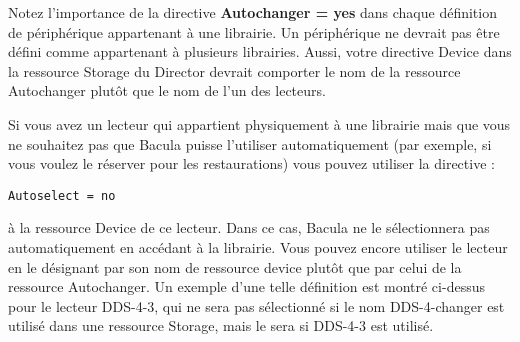 Notez l'importance de la directive {\bf Autochanger = yes} dans chaque d\'efinition 
de p\'eriph\'erique appartenant \`a une librairie. Un p\'eriph\'erique ne devrait pas \^etre 
d\'efini comme appartenant \`a plusieurs librairies. Aussi, votre directive Device 
dans la ressource Storage du Director devrait comporter le nom de la ressource 
Autochanger plut\^ot que le nom de l'un des lecteurs.

Si vous avez un lecteur qui appartient physiquement \`a une librairie mais que 
vous ne souhaitez pas que Bacula puisse l'utiliser automatiquement (par exemple, 
si vous voulez le r\'eserver pour les restaurations) vous pouvez utiliser la 
directive :

\footnotesize
\begin{verbatim}
Autoselect = no
\end{verbatim}
\normalsize

\`a la ressource Device de ce lecteur. Dans ce cas, Bacula ne le s\'electionnera pas 
automatiquement en acc\'edant \`a la librairie. Vous pouvez encore utiliser le lecteur en 
le d\'esignant par son nom de ressource device plut\^ot que par celui de la ressource 
Autochanger. Un exemple d'une telle d\'efinition est montr\'e ci-dessus pour le 
lecteur DDS-4-3, qui ne sera pas s\'electionn\'e si le nom DDS-4-changer est utilis\'e 
dans une ressource Storage, mais le sera si DDS-4-3 est utilis\'e.
